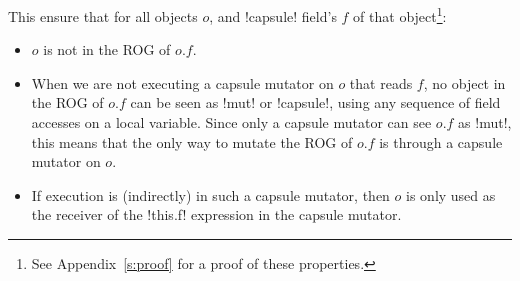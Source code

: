\noindent This ensure that for all objects $o$, and \Q!capsule! field's $f$ of that object\footnote{See Appendix~\ref{s:proof} for a proof of these properties.}:
\SSI\begin{itemize}
	\item $o$ is not in the ROG of $o.f$.
\item 
When we are not executing a capsule mutator on $o$ that reads $f$, no object in the ROG of $o.f$ can be seen as \Q!mut! or \Q!capsule!, using any sequence of field accesses on a local variable.
Since only a capsule mutator can see $o.f$ as \Q!mut!, this means that the only way to mutate the ROG of $o.f$ is through a capsule mutator on $o$.
%
	\item If execution is (indirectly) in such a capsule mutator, then $o$ is only used as the receiver of the \Q!this.f! expression in the capsule mutator. %

\end{itemize} 
